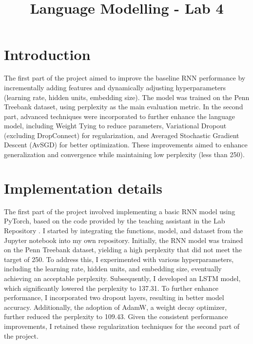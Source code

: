 \documentclass[a4paper]{article}
\title{Language Modelling - Lab 4}
\begin{document}
\maketitle
%
%
\section{Introduction}
The first part of the project aimed to improve the baseline RNN performance by incrementally adding 
features and dynamically adjusting hyperparameters (learning rate, hidden units,
embedding size). The model was trained on the Penn Treebank dataset, using perplexity
as the main evaluation metric. In the second part, advanced techniques \cite{merityRegOpt} were 
incorporated to further enhance the language model, including Weight Tying 
to reduce parameters, Variational Dropout (excluding DropConnect) for 
regularization, and Averaged Stochastic Gradient Descent (AvSGD) for better
optimization. These improvements aimed to enhance generalization and 
convergence while maintaining low perplexity (less than 250). 

\section{Implementation details}

The first part of the project involved implementing a basic RNN model using PyTorch, 
based on the code provided by the teaching assistant in the Lab Repository \cite{nlu-labs-unitn}.
 I started by integrating the functions, model, and dataset from the Jupyter notebook into my own 
 repository. Initially, the RNN model was trained on the Penn Treebank dataset, yielding a high 
 perplexity that did not meet the target of 250. To address this, I experimented with various 
 hyperparameters, including the learning rate, hidden units, and embedding size, eventually 
 achieving an acceptable perplexity. Subsequently, I developed an LSTM model, which significantly 
 lowered the perplexity to 137.31. To further enhance performance, I incorporated two dropout layers,
  resulting in better model accuracy. Additionally, the adoption of AdamW, a weight decay optimizer, 
  further reduced the perplexity to 109.43. Given the consistent performance improvements, I retained
   these regularization techniques for the second part of the project.
\end{document}
